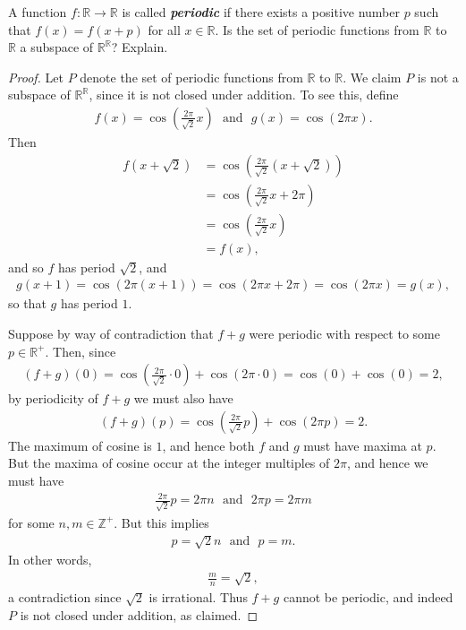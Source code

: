 \documentclass{extarticle}
\newenvironment{problem}[1]{\begin{prob*}{#1}{}}{\end{prob*}}
\newcommand{\Z}{\mathbb{Z}}
\newcommand{\R}{\mathbb{R}}
\begin{document}
\begin{problem}{9}
A function $f:\R\to\R$ is called {\bf{\emph{periodic}}} if there exists a positive number $p$ such that $f(x) = f(x+p)$ for all $x\in\R$.  Is the set of periodic functions from $\R$ to $\R$ a subspace of $\R^\R$?  Explain.
\end{problem}
\begin{proof}
Let $P$ denote the set of periodic functions from $\R$ to $\R$.  We claim $P$ is not a subspace of $\R^\R$, since it is not closed under addition.  To see this, define
\begin{align*}
f(x) = \cos\left(\frac{2\pi }{\sqrt{2}}x\right) ~~~ \text{and} ~~~ g(x) = \cos(2\pi x).
\end{align*}
Then
\begin{align*}
f(x + \sqrt{2}) &= \cos\left(\frac{2\pi}{\sqrt{2}}(x + \sqrt{2})\right)\\
&= \cos\left(\frac{2\pi}{\sqrt{2}}x + 2\pi\right)\\
&= \cos\left(\frac{2\pi}{\sqrt{2}}x\right)\\
&= f(x),
\end{align*}
and so $f$ has period $\sqrt{2}$, and 
\begin{align*}
g(x + 1) = \cos(2\pi(x + 1)) = \cos(2\pi x + 2\pi) = \cos(2\pi x) = g(x),
\end{align*}
so that $g$ has period $1$.
\par Suppose by way of contradiction that $f+g$ were periodic with respect to some $p\in\R^+$.  Then, since
\begin{align*}
(f+g)(0) =  \cos\left(\frac{2\pi }{\sqrt{2}}\cdot 0\right) + \cos(2\pi\cdot 0) = \cos(0) + \cos(0) = 2,
\end{align*}
by periodicity of $f+g$ we must also have
\begin{align*}
(f+g)(p) =  \cos\left(\frac{2\pi }{\sqrt{2}} p\right) + \cos(2\pi p) = 2.
\end{align*}
The maximum of cosine is $1$, and hence both $f$ and $g$ must have maxima at $p$.  But the maxima of cosine occur at the integer multiples of $2\pi$, and hence we must have
\begin{align*}
\frac{2\pi}{\sqrt{2}}p = 2\pi n ~~~ \text{and} ~~~ 2\pi p = 2\pi m
\end{align*}
for some $n,m\in\Z^+$.  But this implies
\begin{align*}
p = \sqrt{2}n ~~~ \text{and} ~~~ p = m.
\end{align*}
In other words,
\begin{align*}
\frac{m}{n} = \sqrt{2},
\end{align*}
a contradiction since $\sqrt{2}$ is irrational.  Thus $f+g$ cannot be periodic, and indeed $P$ is not closed under addition, as claimed.
\end{proof}
\end{document}
